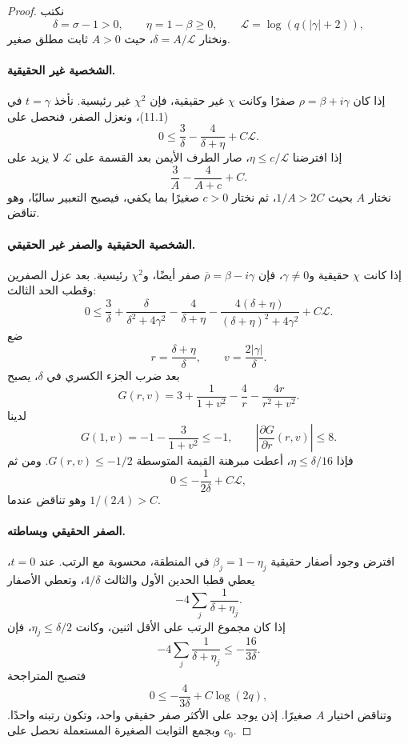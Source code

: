 \begin{proof}
نكتب
\[
\delta=\sigma-1>0,
\qquad \eta=1-\beta\ge0,
\qquad \mathcal L=\log(q(|\gamma|+2)),
\]
ونختار \(\delta=A/\mathcal L\)، حيث \(A>0\) ثابت مطلق صغير.

\paragraph{الشخصية غير الحقيقية.}
إذا كان \(\rho=\beta+i\gamma\) صفرًا وكانت \(\chi\) غير حقيقية، فإن
\(\chi^2\) غير رئيسية. نأخذ \(t=\gamma\) في (11.1)، ونعزل الصفر، فنحصل
على
\[
0\le
\frac3\delta-
\frac4{\delta+\eta}+C\mathcal L.
\tag{11.3}
\]
إذا افترضنا \(\eta\le c/\mathcal L\)، صار الطرف الأيمن بعد القسمة على
\(\mathcal L\) لا يزيد على
\[
\frac3A-\frac4{A+c}+C.
\]
نختار \(A\) بحيث \(1/A>2C\)، ثم نختار \(c>0\) صغيرًا بما يكفي، فيصبح
التعبير سالبًا، وهو تناقض.

\paragraph{الشخصية الحقيقية والصفر غير الحقيقي.}
إذا كانت \(\chi\) حقيقية و\(\gamma\ne0\)، فإن
\(\overline\rho=\beta-i\gamma\) صفر أيضًا، و\(\chi^2\) رئيسية. بعد عزل
الصفرين وقطب الحد الثالث:
\[
0\le
\frac3\delta+
\frac{\delta}{\delta^2+4\gamma^2}-
\frac4{\delta+\eta}-
\frac{4(\delta+\eta)}{(\delta+\eta)^2+4\gamma^2}
+C\mathcal L.
\tag{11.4}
\]
ضع
\[
r=\frac{\delta+\eta}{\delta},
\qquad v=\frac{2|\gamma|}{\delta}.
\]
بعد ضرب الجزء الكسري في \(\delta\)، يصبح
\[
G(r,v)=3+\frac1{1+v^2}-\frac4r-
\frac{4r}{r^2+v^2}.
\]
لدينا
\[
G(1,v)=-1-\frac3{1+v^2}\le-1,
\qquad
\left|\frac{\partial G}{\partial r}(r,v)\right|\le8.
\]
فإذا \(\eta\le\delta/16\)، أعطت مبرهنة القيمة المتوسطة
\(G(r,v)\le-1/2\). ومن ثم
\[
0\le-\frac1{2\delta}+C\mathcal L,
\]
وهو تناقض عندما \(1/(2A)>C\).

\paragraph{الصفر الحقيقي وبساطته.}
افترض وجود أصفار حقيقية \(\beta_j=1-\eta_j\) في المنطقة، محسوبة مع
الرتب. عند \(t=0\)، يعطي قطبا الحدين الأول والثالث \(4/\delta\)، وتعطي
الأصفار
\[
-4\sum_j\frac1{\delta+\eta_j}.
\]
إذا كان مجموع الرتب على الأقل اثنين، وكانت \(\eta_j\le\delta/2\)، فإن
\[
-4\sum_j\frac1{\delta+\eta_j}
\le-\frac{16}{3\delta}.
\]
فتصبح المتراجحة
\[
0\le-\frac4{3\delta}+C\log(2q),
\]
وتناقض اختيار \(A\) صغيرًا. إذن يوجد على الأكثر صفر حقيقي واحد، وتكون
رتبته واحدًا. وبجمع الثوابت الصغيرة المستعملة نحصل على \(c_0\).
\end{proof}

